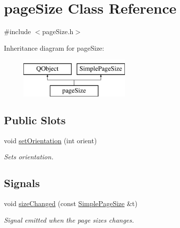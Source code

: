 \hypertarget{classpageSize}{\section{page\+Size Class Reference}
\label{classpageSize}
}


{\ttfamily \#include $<$page\+Size.\+h$>$}

Inheritance diagram for page\+Size\+:\begin{figure}[H]
\begin{center}
\leavevmode
\includegraphics[height=2.000000cm]{classpageSize}
\end{center}
\end{figure}
\subsection*{Public Slots}
\begin{DoxyCompactItemize}
\item 
void \hyperlink{classpageSize_acca668161756a8e0ae0fea18d06292b5}{set\+Orientation} (int orient)
\begin{DoxyCompactList}\small\item\em Sets orientation. \end{DoxyCompactList}\end{DoxyCompactItemize}
\subsection*{Signals}
\begin{DoxyCompactItemize}
\item 
void \hyperlink{classpageSize_ae49ee59892403f920d614d0c8d9daa5b}{size\+Changed} (const \hyperlink{classSimplePageSize}{Simple\+Page\+Size} \&t)
\begin{DoxyCompactList}\small\item\em Signal emitted when the page sizes changes. \end{DoxyCompactList}\end{DoxyCompactItemize}
